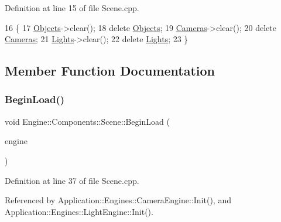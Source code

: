 Definition at line 15 of file Scene.\+cpp.


\begin{DoxyCode}
16 \{
17     \mbox{\hyperlink{classEngine_1_1Components_1_1Scene_a23481feabaaa56bf5613765db03af4da}{Objects}}->clear();
18     \textcolor{keyword}{delete} \mbox{\hyperlink{classEngine_1_1Components_1_1Scene_a23481feabaaa56bf5613765db03af4da}{Objects}};
19     \mbox{\hyperlink{classEngine_1_1Components_1_1Scene_aea98ff1ced88ee859878b504e9a2a362}{Cameras}}->clear();
20     \textcolor{keyword}{delete} \mbox{\hyperlink{classEngine_1_1Components_1_1Scene_aea98ff1ced88ee859878b504e9a2a362}{Cameras}};
21     \mbox{\hyperlink{classEngine_1_1Components_1_1Scene_a00f60de2f6c72242a7af0076a3b75e5e}{Lights}}->clear();
22     \textcolor{keyword}{delete} \mbox{\hyperlink{classEngine_1_1Components_1_1Scene_a00f60de2f6c72242a7af0076a3b75e5e}{Lights}};
23 \}
\end{DoxyCode}


\subsection{Member Function Documentation}
\mbox{\label{classEngine_1_1Components_1_1Scene_af18bd334fe66952b8d79b8e9e99ab2d8}} 
\subsubsection{\texorpdfstring{Begin\+Load()}{BeginLoad()}}
{\footnotesize\ttfamily void Engine\+::\+Components\+::\+Scene\+::\+Begin\+Load (\begin{DoxyParamCaption}\item[{\mbox{\hyperlink{classEngine_1_1BaseEngine}{Base\+Engine}} $\ast$}]{engine }\end{DoxyParamCaption})\hspace{0.3cm}{\ttfamily [virtual]}}



Definition at line 37 of file Scene.\+cpp.



Referenced by Application\+::\+Engines\+::\+Camera\+Engine\+::\+Init(), and Application\+::\+Engines\+::\+Light\+Engine\+::\+Init().


